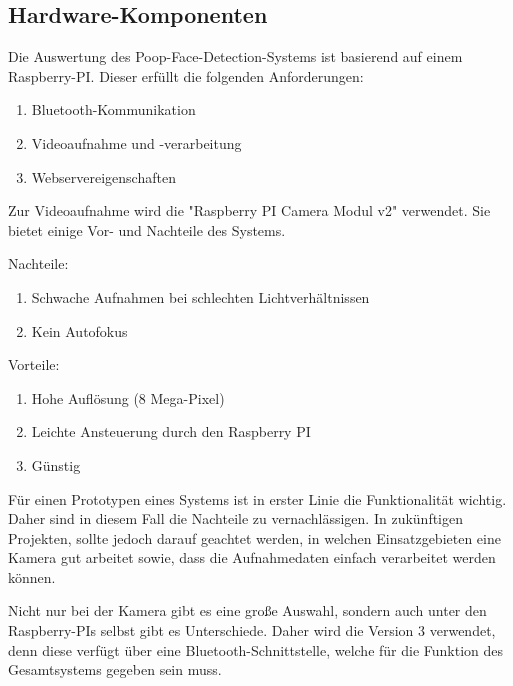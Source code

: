 \subsection{Hardware-Komponenten}
\label{subsec:evalsys_hardware}

Die Auswertung des Poop-Face-Detection-Systems ist basierend auf einem Raspberry-PI. Dieser erfüllt die folgenden Anforderungen:

\begin{enumerate}
\item Bluetooth-Kommunikation
\item Videoaufnahme und -verarbeitung
\item Webservereigenschaften
\end{enumerate}

Zur Videoaufnahme wird die "Raspberry PI Camera Modul v2" verwendet. Sie bietet einige Vor- und Nachteile des Systems.

Nachteile:
\begin{enumerate}
\item Schwache Aufnahmen bei schlechten Lichtverhältnissen
\item Kein Autofokus
\end{enumerate}

Vorteile:
\begin{enumerate}
\item Hohe Auflösung (8 Mega-Pixel)
\item Leichte Ansteuerung durch den Raspberry PI
\item Günstig
\end{enumerate}

Für einen Prototypen eines Systems ist in erster Linie die Funktionalität wichtig. Daher sind in diesem Fall die Nachteile zu vernachlässigen. In zukünftigen Projekten, sollte jedoch darauf geachtet werden, in welchen Einsatzgebieten eine Kamera gut arbeitet sowie, dass die Aufnahmedaten einfach verarbeitet werden können.

Nicht nur bei der Kamera gibt es eine große Auswahl, sondern auch unter den Raspberry-PIs selbst gibt es Unterschiede. Daher wird die Version 3 verwendet, denn diese verfügt über eine Bluetooth-Schnittstelle, welche für die Funktion des Gesamtsystems gegeben sein muss. 
